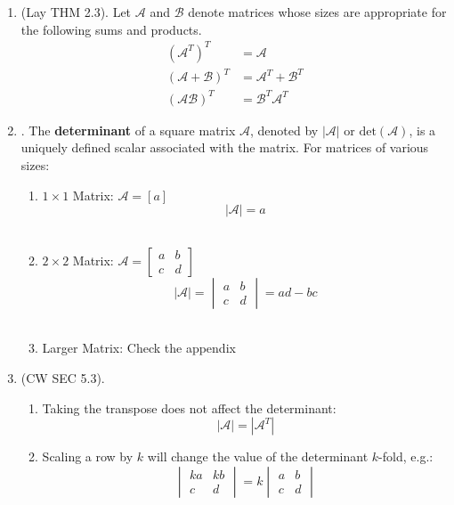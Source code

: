 \documentclass[12pt]{article}
\begin{document}
\begin{enumerate}
\begin{enumerate}
	\item\underline{} (Lay THM 2.3).
		Let $\mathcal{A}$ and $\mathcal{B}$ denote matrices whose sizes are appropriate for the following sums and products.
			\begin{align*}
				(\mathcal{A}^T)^T 	&= \mathcal{A}			\\
				(\mathcal{A+B})^T	&= \mathcal{A}^T + \mathcal{B}^T	\\
				(\mathcal{AB})^T	&= \mathcal{B}^T\mathcal{A}^T
			\end{align*}

\newpage

	\item \underline{}.
		The \textbf{determinant} of a square matrix $\mathcal{A}$, denoted by $|\mathcal{A}|$ or $\text{det}(\mathcal{A})$, is a uniquely defined scalar associated with the matrix. For matrices of various sizes:
		\begin{enumerate}
		\item $1\times1$ Matrix: $\mathcal{A}=[a]$
			\[|\mathcal{A}|=a\]\\[-20pt]

		\item $2\times 2$ Matrix: $\mathcal{A}=\begin{bmatrix}
									a & b \\ 
									c & d
									\end{bmatrix}$
			\[|\mathcal{A}| = \begin{vmatrix}
						a & b \\ 
						c & d \end{vmatrix}
						=ad-bc\]\\[-20pt]
						
		\item Larger Matrix: Check the appendix
		\end{enumerate}
	
	\item\underline{} (CW SEC 5.3).
		\begin{enumerate}
		\item Taking the transpose does not affect the determinant:
			\[|\mathcal{A}|=|\mathcal{A}^T|\]

		\item Scaling a row by $k$ will change the value of the determinant $k$-fold, e.g.:
			\[\begin{vmatrix}
				ka	&kb	\\ 
				c	&d	\end{vmatrix}
			= k \begin{vmatrix}
				a 	&b	\\
				c	&d	\end{vmatrix}\]


\end{enumerate}
\end{enumerate}
\end{enumerate}
\end{document}
